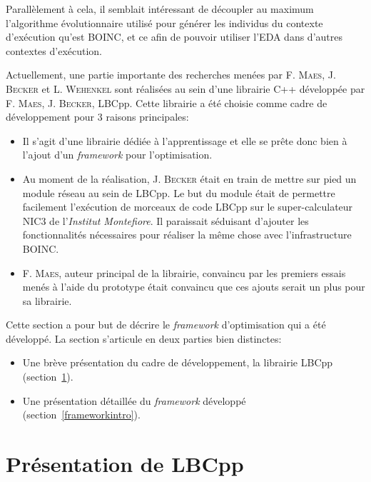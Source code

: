 \documentclass[a4paper, 11pt]{report}
\begin{document}
Parallèlement à cela, il semblait intéressant de découpler au maximum l'algorithme évolutionnaire utilisé pour générer les individus du contexte d'exécution qu'est \textsc{BOINC}, et ce afin de pouvoir utiliser l'EDA dans d'autres contextes d'exécution.

Actuellement, une partie importante des recherches menées par F. \textsc{Maes}, J. \textsc{Becker} et L. \textsc{Wehenkel} sont réalisées au sein d'une librairie C++ développée par F. \textsc{Maes}, J. \textsc{Becker}, LBCpp. Cette librairie a été choisie comme cadre de développement pour 3 raisons principales:
\begin{itemize}
\item Il s'agit d'une librairie dédiée à l'apprentissage et elle se prête donc bien à l'ajout d'un \textit{framework} pour l'optimisation.
\item Au moment de la réalisation, J. \textsc{Becker} était en train de mettre sur pied un module réseau au sein de LBCpp. Le but du module était de permettre facilement l'exécution de morceaux de code LBCpp sur le super-calculateur NIC3 de l'\textit{Institut Montefiore}. Il paraissait séduisant d'ajouter les fonctionnalités nécessaires pour réaliser la même chose avec l'infrastructure \textsc{BOINC}.
\item F. \textsc{Maes}, auteur principal de la librairie, convaincu par les premiers essais menés à l'aide du prototype était convaincu que ces ajouts serait un plus pour sa librairie.
\end{itemize}

Cette section a pour but de décrire le \textit{framework} d'optimisation qui a été développé. La section s'articule en deux parties bien distinctes:
\begin{itemize}
\item Une brève présentation du cadre de développement, la librairie LBCpp (section~\ref{LBCpp}).
\item Une présentation détaillée du \textit{framework} développé (section~\ref{frameworkintro}).
\end{itemize}

\section{Présentation de LBCpp}
\label{LBCpp}
\end{document}
